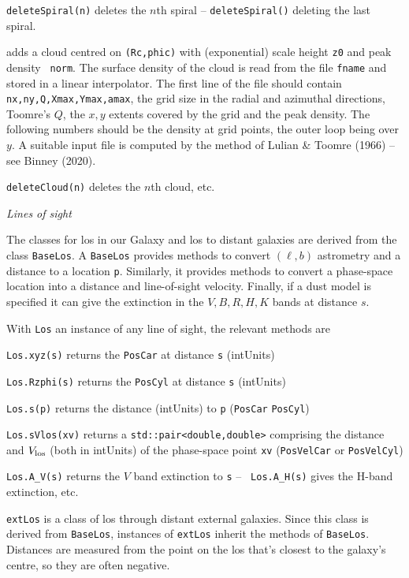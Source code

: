 \nwsec
{\tt deleteSpiral(n)} deletes the $n$th spiral -- {\tt deleteSpiral()}
deleting the last spiral.

 adds a cloud centred on
{\tt(Rc,phic)} with (exponential) scale height {\tt z0} and peak density {\tt
norm}. The surface density of the cloud is read from the file {\tt fname} and
stored in a linear interpolator. The first line of the file should contain
{\tt nx,ny,Q,Xmax,Ymax,amax}, the grid size in the radial and azimuthal
directions, Toomre's $Q$, the $x,y$ extents covered by the grid and the peak
density. The following numbers should be the density at grid points, the
outer loop being over $y$. A suitable input file is computed by the method of
Lulian \& Toomre (1966) -- see Binney (2020). 

\nwsec
{\tt deleteCloud(n)} deletes the $n$th cloud, etc.


\bigskip\centerline{\it Lines of sight}

\nwsec
The classes for los in our Galaxy and los to distant galaxies are derived
from the class {\tt BaseLos}. A {\tt BaseLos} provides methods to convert
$(\ell,b)$ astrometry and a distance to a location {\tt p}.
Similarly, it provides methods to convert a phase-space location into a
distance and line-of-sight velocity. Finally, if a dust model is specified it
can give the extinction in the $V,B,R,H,K$ bands at distance $s$.

With {\tt Los} an instance of any line of sight, the relevant methods are


\nwsec
{\tt Los.xyz(s)} returns the {\tt PosCar} at distance {\tt s} (intUnits)

\nwsec
{\tt Los.Rzphi(s)} returns the {\tt PosCyl} at distance {\tt s} (intUnits)

\nwsec
{\tt Los.s(p)} returns the distance (intUnits) to {\tt p} ({\tt PosCar} {\tt PosCyl})

\nwsec
{\tt Los.sVlos(xv)} returns a {\tt std::pair<double,double>} comprising the
distance and $V_{\rm los}$ (both in intUnits) of the phase-space point {\tt xv} ({\tt PosVelCar} or
{\tt PosVelCyl}) 

\nwsec
{\tt Los.A\_V(s)} returns the $V$ band extinction to {\tt s} -- {\tt
Los.A\_H(s)} gives the H-band extinction, etc.

\nwsec
{\tt extLos} is a class of los through distant external galaxies. Since this
class is derived from {\tt BaseLos}, instances
of {\tt extLos} inherit the methods of {\tt BaseLos}. Distances are measured
from the point on the los that's closest to the galaxy's centre, so they are
often negative.


